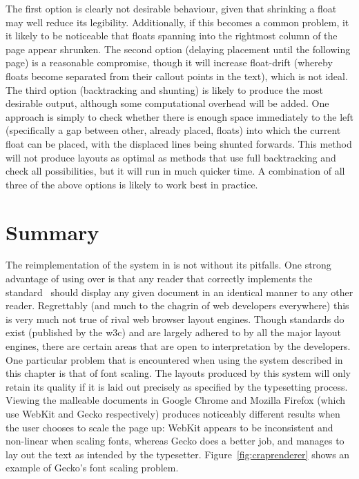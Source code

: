 The first option is clearly not desirable behaviour, given that shrinking a float may well reduce its legibility. Additionally, if this becomes a common problem, it it likely to be noticeable that floats spanning into the rightmost column of the page appear shrunken. The second option (delaying placement until the following page) is a reasonable compromise, though it will increase float-drift (whereby floats become separated from their callout points in the text), which is not ideal. The third option (backtracking and shunting) is likely to produce the most desirable output, although some computational overhead will be added. One approach is simply to check whether there is enough space immediately to the left (specifically a gap between other, already placed, floats) into which the current float can be placed, with the displaced lines being shunted forwards. This method will not produce layouts as optimal as methods that use full backtracking and check all possibilities, but it will run in much quicker time. A combination of all three of the above options is likely to work best in practice.



\section{Summary}

The reimplementation of the system in \html{} is not without its pitfalls. One strong advantage of using \pdf{} over \html{} is that any \pdf{} reader that correctly implements the standard~\cite{Adobe2001} should display any given document in an identical manner to any other reader. Regrettably (and much to the chagrin of web developers everywhere) this is very much not true of rival web browser layout engines. Though standards do exist (published by the \gls{w3c}) and are largely adhered to by all the major layout engines, there are certain areas that are open to interpretation by the developers. One particular problem that is encountered when using the system described in this chapter is that of font scaling. The layouts produced by this system will only retain its quality if it is laid out precisely as specified by the typesetting process. Viewing the malleable documents in Google Chrome and Mozilla Firefox (which use WebKit and Gecko respectively) produces noticeably different results when the user chooses to scale the page up: WebKit appears to be inconsistent and non-linear when scaling fonts, whereas Gecko does a better job, and manages to lay out the text as intended by the typesetter. Figure~\ref{fig:craprenderer} shows an example of Gecko's font scaling problem.

